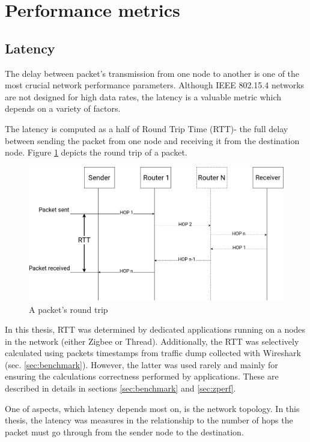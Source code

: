 

\section{Performance metrics}
\label{sec:performance-metrics}
\subsection*{Latency}

The delay between packet's transmission from one node to another is one of the 
most crucial network performance parameters. Although IEEE 802.15.4 networks are not
designed for high data rates, the latency is a valuable metric which depends on a variety of 
factors.

The latency is computed as a half of Round Trip Time (RTT)- the full delay between sending the packet from one node and receiving it from the destination node. Figure \ref{fig:round_trip}  depicts the round trip of a packet.
\vspace{2em}

\begin{figure} [H]
    \centering
    \includegraphics[scale=0.3]{images/rtt-diagram.png}
    \caption{A packet's round trip}
    \label{fig:round_trip}
\end{figure}

In this thesis, RTT was determined by dedicated applications running on a nodes in the
network (either Zigbee or Thread). Additionally, the RTT was selectively 
calculated using packets timestamps from traffic dump collected with Wireshark (sec. 
\ref{sec:benchmark}). However, the latter was used rarely and mainly for ensuring the
calculations correctness performed by applications. These are described in 
details in sections \ref{sec:benchmark} and \ref{sec:zperf}.

One of aspects, which latency depends most on, is the network topology. In this thesis,
the latency was measures in the relationship to the number of hops the packet must go through 
from the sender node to the destination.

